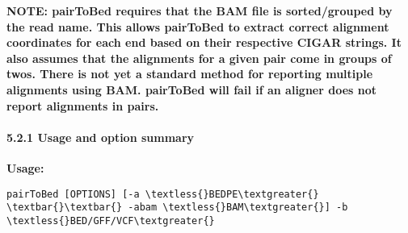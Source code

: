\documentclass[letterpaper,10pt,english]{sphinxmanual}
\begin{document}
\textbf{NOTE: pairToBed requires that the BAM file is sorted/grouped by the read name. This
allows pairToBed to extract correct alignment coordinates for each end based on their
respective CIGAR strings. It also assumes that the alignments for a given pair come in
groups of twos. There is not yet a standard method for reporting multiple alignments
using BAM. pairToBed will fail if an aligner does not report alignments in pairs.}


\paragraph{5.2.1 Usage and option summary}
\label{content/pairToBed:usage-and-option-summary}
\textbf{Usage:}

\begin{Verbatim}[commandchars=\\\{\}]
pairToBed [OPTIONS] [-a \textless{}BEDPE\textgreater{} \textbar{}\textbar{} -abam \textless{}BAM\textgreater{}] -b \textless{}BED/GFF/VCF\textgreater{}
\end{Verbatim}
\end{document}
